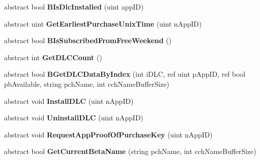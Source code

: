 \begin{DoxyCompactItemize}
abstract bool {\bfseries B\+Is\+Dlc\+Installed} (uint app\+ID)
\item 
\mbox{\label{class_valve_1_1_steamworks_1_1_i_steam_apps_ab4d33dc6402b631a9556a02f34787d78}} 
abstract uint {\bfseries Get\+Earliest\+Purchase\+Unix\+Time} (uint n\+App\+ID)
\item 
\mbox{\label{class_valve_1_1_steamworks_1_1_i_steam_apps_acafdd68163f6fbc25f5e84033f478904}} 
abstract bool {\bfseries B\+Is\+Subscribed\+From\+Free\+Weekend} ()
\item 
\mbox{\label{class_valve_1_1_steamworks_1_1_i_steam_apps_a8601df8475470561c923c528eef34c1f}} 
abstract int {\bfseries Get\+D\+L\+C\+Count} ()
\item 
\mbox{\label{class_valve_1_1_steamworks_1_1_i_steam_apps_afad40d11887aa32e67ff4299db15a285}} 
abstract bool {\bfseries B\+Get\+D\+L\+C\+Data\+By\+Index} (int i\+D\+LC, ref uint p\+App\+ID, ref bool pb\+Available, string pch\+Name, int cch\+Name\+Buffer\+Size)
\item 
\mbox{\label{class_valve_1_1_steamworks_1_1_i_steam_apps_aa400ca6418a5e97d5e191880c7e43177}} 
abstract void {\bfseries Install\+D\+LC} (uint n\+App\+ID)
\item 
\mbox{\label{class_valve_1_1_steamworks_1_1_i_steam_apps_aa7ccd1307aaf66986efea6861232dce7}} 
abstract void {\bfseries Uninstall\+D\+LC} (uint n\+App\+ID)
\item 
\mbox{\label{class_valve_1_1_steamworks_1_1_i_steam_apps_ab4cc69cc377927e9908586bace00619b}} 
abstract void {\bfseries Request\+App\+Proof\+Of\+Purchase\+Key} (uint n\+App\+ID)
\item 
\mbox{\label{class_valve_1_1_steamworks_1_1_i_steam_apps_a24ee7b2dc681f3706d5228066a6140df}} 
abstract bool {\bfseries Get\+Current\+Beta\+Name} (string pch\+Name, int cch\+Name\+Buffer\+Size)
\item 

\end{DoxyCompactItemize}
